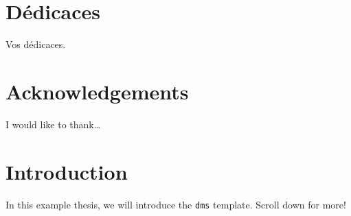 \documentclass[12pt,maitrise,nobabel,anglais,twoside,initial]{template/dms}
\numberwithin{equation}{section}
\numberwithin{table}{chapter}
\numberwithin{figure}{chapter}
\begin{document}
\chapter*{D\protect\'edicaces}

\vspace{2cm}
\hspace{2.5cm}Vos d\'edicaces.

\chapter*{Acknowledgements} %

\noindent I would like to thank\ldots



\NoChapterPageNumber 
\cleardoublepage



\chapter*{Introduction}


\noindent In this example thesis, we will introduce
  the \texttt{dms} template.  Scroll down for more!


\




% 
\end{document}
